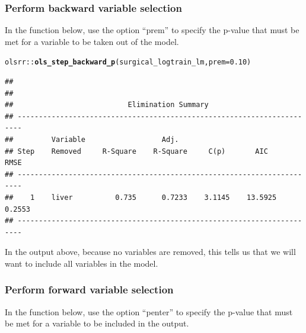 \documentclass{article}\usepackage[]{graphicx}\usepackage[]{color}
\makeatletter
\newcommand{\hlnum}[1]{\textcolor[rgb]{0.686,0.059,0.569}{#1}}%
\newcommand{\hlopt}[1]{\textcolor[rgb]{0,0,0}{#1}}%
\newcommand{\hlstd}[1]{\textcolor[rgb]{0.345,0.345,0.345}{#1}}%
\newcommand{\hlkwc}[1]{\textcolor[rgb]{0.333,0.667,0.333}{#1}}%
\newcommand{\hlkwd}[1]{\textcolor[rgb]{0.737,0.353,0.396}{\textbf{#1}}}%
\newenvironment{kframe}{%
 \def\at@end@of@kframe{}%
 \ifinner\ifhmode%
  \def\at@end@of@kframe{\end{minipage}}%
  \begin{minipage}{\columnwidth}%
 \fi\fi%
 \def\FrameCommand##1{\hskip\@totalleftmargin \hskip-\fboxsep
 \colorbox{shadecolor}{##1}\hskip-\fboxsep
     \hskip-\linewidth \hskip-\@totalleftmargin \hskip\columnwidth}%
 \MakeFramed {\advance\hsize-\width
   \@totalleftmargin\z@ \linewidth\hsize
   \@setminipage}}%
 {\par\unskip\endMakeFramed%
 \at@end@of@kframe}
\newenvironment{knitrout}{}{} %
\makeatother
\begin{document}
\subsubsection*{Perform backward variable selection}

In the function below, use the option ``prem'' to specify the p-value that must be met for a variable to be taken out of the model.

\begin{knitrout}
\color{fgcolor}\begin{kframe}
\begin{alltt}
\hlstd{olsrr}\hlopt{::}\hlkwd{ols_step_backward_p}\hlstd{(surgical_logtrain_lm,} \hlkwc{prem} \hlstd{=} \hlnum{0.10}\hlstd{)}
\end{alltt}
\begin{verbatim}
## 
## 
##                           Elimination Summary                           
## -----------------------------------------------------------------------
##         Variable                  Adj.                                     
## Step    Removed     R-Square    R-Square     C(p)       AIC       RMSE     
## -----------------------------------------------------------------------
##    1    liver          0.735      0.7233    3.1145    13.5925    0.2553    
## -----------------------------------------------------------------------
\end{verbatim}
\end{kframe}
\end{knitrout}

In the output above, because no variables are removed, this tells us that we will want to include all variables in the model.

\subsubsection*{Perform forward variable selection}

In the function below, use the option ``penter'' to specify the p-value that must be met for a variable to be included in the output.
\end{document}
